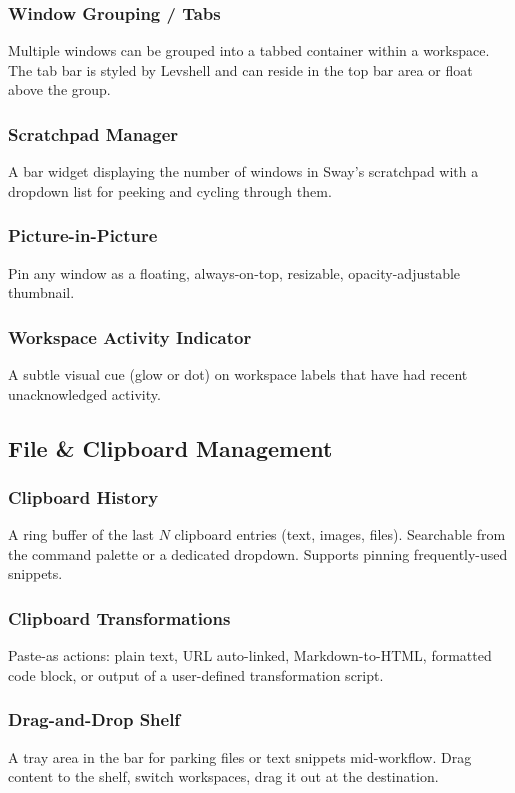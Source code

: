 \documentclass[11pt,a4paper]{article}
\begin{document}
\subsubsection{Window Grouping / Tabs}
Multiple windows can be grouped into a tabbed container within a workspace. The tab bar is styled by Levshell and can reside in the top bar area or float above the group.

\subsubsection{Scratchpad Manager}
A bar widget displaying the number of windows in Sway's scratchpad with a dropdown list for peeking and cycling through them.

\subsubsection{Picture-in-Picture}
Pin any window as a floating, always-on-top, resizable, opacity-adjustable thumbnail.

\subsubsection{Workspace Activity Indicator}
A subtle visual cue (glow or dot) on workspace labels that have had recent unacknowledged activity.


\subsection{File \& Clipboard Management}
\label{sec:features-clipboard}

\subsubsection{Clipboard History}
A ring buffer of the last $N$ clipboard entries (text, images, files). Searchable from the command palette or a dedicated dropdown. Supports pinning frequently-used snippets.

\subsubsection{Clipboard Transformations}
Paste-as actions: plain text, URL auto-linked, Markdown-to-HTML, formatted code block, or output of a user-defined transformation script.

\subsubsection{Drag-and-Drop Shelf}
A tray area in the bar for parking files or text snippets mid-workflow. Drag content to the shelf, switch workspaces, drag it out at the destination.
\end{document}
